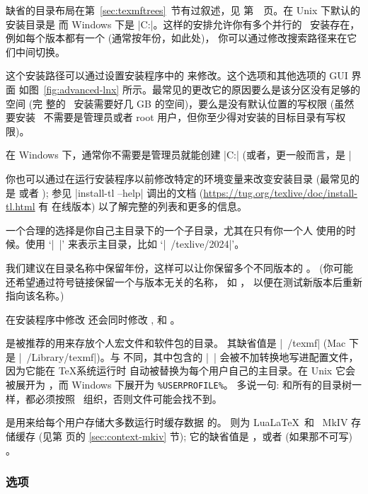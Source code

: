 \documentclass{article}
\begin{document}
缺省的目录布局在第~\ref{sec:texmftrees}~节有过叙述，见
第~\pageref{sec:texmftrees}~页。在 Unix 下默认的安装目录是
 而 Windows 下是
|C:\texlive{}|。这样的安排允许你有多个并行的 \TL\ 安装存在，
例如每个版本都有一个 (通常按年份，如此处)，
你可以通过修改搜索路径来在它们中间切换。

这个安装路径可以通过设置安装程序中的  来修改。这个选项和其他选项的 GUI 界面
如图~\ref{fig:advanced-lnx} 所示。最常见的更改它的原因要么是该分区没有足够的空间 (完
整的 \TL\ 安装需要好几 GB 的空间)，要么是没有默认位置的写权限 (虽然要安装
\TL\ 不需要是管理员或者 root 用户，但你至少得对安装的目标目录有写权限)。

在 Windows 下，通常你不需要是管理员就能创建 |C:\texlive{}|
(或者，更一般而言，是 |%

你也可以通过在运行安装程序以前修改特定的环境变量来改变安装目录 (最常见的是
 或者 ); 
参见 |install-tl --help| 调出的文档 (\url{https://tug.org/texlive/doc/install-tl.html} 有
在线版本) 以了解完整的列表和更多的信息。

一个合理的选择是你自己主目录下的一个子目录，尤其在只有你一个人
使用的时候。使用 `|~|' 来表示主目录，比如 `|~/texlive/2024|'。

我们建议在目录名称中保留年份，这样可以让你保留多个不同版本的 \TL{}。
(你可能还希望通过符号链接保留一个与版本无关的名称，
如 ，
以便在测试新版本后重新指向该名称。)

在安装程序中修改  还会同时修改
,  和
。

 是被推荐的用来存放个人宏文件和软件包的目录。
其缺省值是 |~/texmf| (Mac 下是 |~/Library/texmf|)。与 
不同，其中包含的 |~| 会被不加转换地写进配置文件，因为它能在 \TeX 系统运行时
自动被替换为每个用户自己的主目录。在 Unix 它会被展开为
，而 Windows 下展开为 \verb|%USERPROFILE%|。
多说一句:  和所有的目录树一样，都必须按照
\TDS\ 组织，否则文件可能会找不到。

 是用来给每个用户存储大多数运行时缓存数据
的。 则为 Lua\LaTeX\ 和 \ConTeXt\ MkIV 存储缓存
(见第 \pageref{sec:context-mkiv} 页的 \ref{sec:context-mkiv} 节); 它的缺省值是
，或者 (如果那不可写) 。

\subsubsection{选项}
\label{sec:options}
\end{document}
